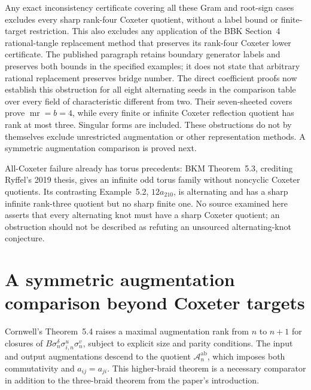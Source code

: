 \documentclass[11pt]{article}
\newcommand{\mr}{\operatorname{mr}}
\begin{document}
Any exact inconsistency certificate covering all these Gram and root-sign
cases excludes every sharp rank-four Coxeter quotient, without a label
bound or finite-target restriction.  This also excludes any application
of the BBK Section~4 rational-tangle replacement method that preserves
its rank-four Coxeter lower certificate.  The published paragraph
retains boundary generator labels and preserves both bounds in the
specified examples; it does not state that arbitrary rational replacement
preserves bridge number.  The direct coefficient proofs now establish this obstruction for
all eight alternating seeds in the comparison table over every field
of characteristic different from two. Their seven-sheeted covers prove
$\mr=b=4$, while every finite or infinite Coxeter reflection
quotient has rank at most three. Singular forms are included.
These obstructions do not by themselves exclude unrestricted
augmentation or other representation methods. A symmetric
augmentation comparison is proved next.

All-Coxeter failure already has torus precedents: BKM Theorem~5.3,
crediting Ryffel's 2019 thesis, gives an infinite odd torus family
without noncyclic Coxeter quotients.  Its contrasting Example~5.2,
$12a_{210}$, is alternating and has a sharp infinite rank-three
quotient but no sharp finite one.  No source examined here asserts
that every alternating knot must have a sharp Coxeter quotient;
an obstruction should not be described as refuting an unsourced
alternating-knot conjecture.

\section{A symmetric augmentation comparison beyond Coxeter targets}

Cornwell's Theorem~5.4 \cite{cornwell17} raises a maximal augmentation
rank from $n$ to $n+1$ for closures of
$B\sigma_n^\delta\sigma_{i,n}^u\sigma_n^v$, subject to explicit
size and parity conditions. The input and output augmentations
descend to the quotient $\mathcal A_n^{\mathrm{ab}}$, which imposes
both commutativity and $a_{ij}=a_{ji}$. This higher-braid theorem
is a necessary comparator in addition to the three-braid theorem
from the paper's introduction.
\end{document}
